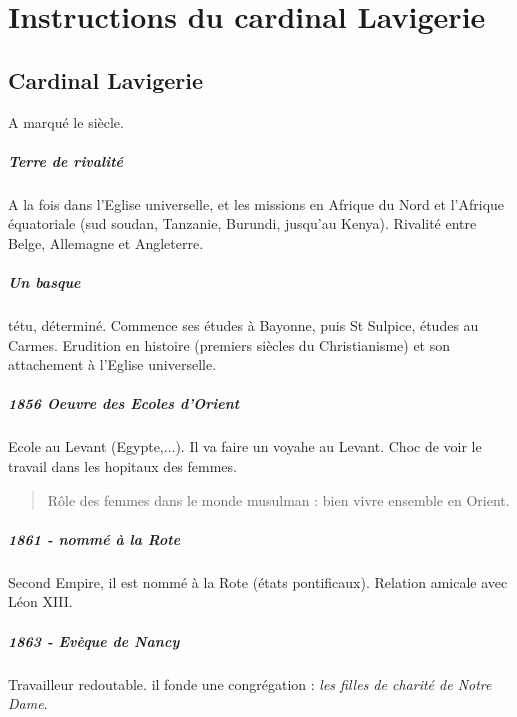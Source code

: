 \chapter{Instructions du cardinal Lavigerie}


\section{Cardinal Lavigerie}

A marqué le siècle. 

\paragraph{Terre de rivalité} A la fois dans l'Eglise universelle, et les missions en Afrique du Nord et l'Afrique équatoriale (sud soudan, Tanzanie, Burundi, jusqu'au Kenya). Rivalité entre Belge, Allemagne et Angleterre. 

\paragraph{Un basque} tétu, déterminé. Commence ses études à Bayonne, puis St Sulpice, études au Carmes. Erudition en histoire (premiers siècles du Christianisme) et son attachement à l'Eglise universelle.

\paragraph{1856 Oeuvre des Ecoles d'Orient} Ecole au Levant (Egypte,...). Il va faire un voyahe au Levant. Choc de voir le travail dans les hopitaux des femmes.
\begin{quote}
    Rôle des femmes dans le monde musulman : bien vivre ensemble en Orient.
\end{quote}

\paragraph{1861 - nommé à la Rote} Second Empire, il est nommé à la Rote (états pontificaux). Relation amicale avec Léon XIII.

\paragraph{1863 - Evèque de Nancy} Travailleur redoutable. il fonde une congrégation : \textit{les filles de charité de Notre Dame}. 

